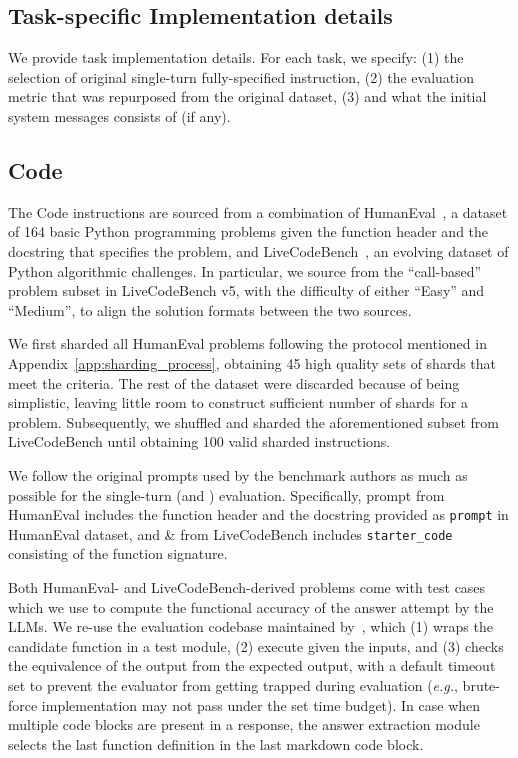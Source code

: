 \documentclass{article}
\begin{document}
\begin{appendices}


\section{Task-specific Implementation details} \label{app:task_implementation}

We provide task implementation details. For each task, we specify: (1) the selection of original single-turn fully-specified instruction, (2) the evaluation metric that was repurposed from the original dataset, (3) and what the initial system messages consists of (if any). %

\subsection{\texorpdfstring{\python Code}{Code}}

The Code instructions are sourced from a combination of HumanEval~\cite{chen2021evaluating}, a dataset of 164 basic Python programming problems given the function header and the docstring that specifies the problem, and LiveCodeBench~\cite{jain2024livecodebench}, an evolving dataset of Python algorithmic challenges.
In particular, we source from the ``call-based'' problem subset in LiveCodeBench v5, with the difficulty of either ``Easy'' and ``Medium'', to align the solution formats between the two sources.

We first sharded all HumanEval problems following the protocol mentioned in Appendix~\ref{app:sharding_process}, obtaining 45 high quality sets of shards that meet the criteria. The rest of the dataset were discarded because of being simplistic, leaving little room to construct sufficient number of shards for a problem.
Subsequently, we shuffled and sharded the aforementioned subset from LiveCodeBench until obtaining 100 valid sharded instructions.

We follow the original prompts used by the benchmark authors as much as possible for the single-turn (\fullt and \concatt) evaluation. %
Specifically, \fullt prompt from HumanEval includes the function header and the docstring provided as \texttt{prompt} in HumanEval dataset, and \fullt \& \concatt from LiveCodeBench includes \texttt{starter\_code} consisting of the function signature.

Both HumanEval- and LiveCodeBench-derived problems come with test cases which we use to compute the functional accuracy of the answer attempt by the LLMs.
We re-use the evaluation codebase maintained by~\citet{jain2024livecodebench}, which (1) wraps the candidate function in a test module, (2) execute given the inputs, and (3) checks the equivalence of the output from the expected output, with a default timeout set to prevent the evaluator from getting trapped during evaluation (\textit{e.g.}, brute-force implementation may not pass under the set time budget).
In case when multiple code blocks are present in a response, the answer extraction module selects the last function definition in the last markdown code block.


\end{appendices}
\end{document}
